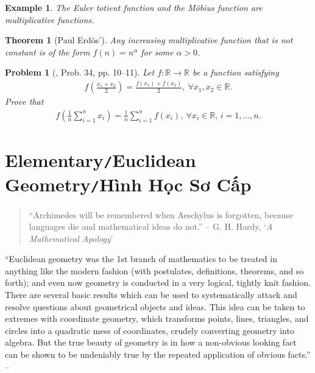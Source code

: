 \documentclass[oneside]{book}
\numberwithin{equation}{section}
\newtheorem{theorem}{Theorem}[section]
\newtheorem{example}{Example}[section]
\newtheorem{problem}{Problem}[section]
\begin{document}
\begin{example}
	The \emph{Euler totient function} and the \emph{M\"obius function} are multiplicative functions.
\end{example}

\begin{theorem}[Paul Erd\"os']
	Any increasing multiplicative function that is not constant is of the form $f(n) = n^\alpha$ for some $\alpha > 0$.
\end{theorem}

\begin{problem}[\cite{Gelca_Andreescu2017}, Prob. 34, pp. 10--11]
	Let $f:\mathbb{R}\to\mathbb{R}$ be a function satisfying
	\begin{align*}
		f\left(\frac{x_1 + x_2}{2}\right) = \frac{f(x_1) + f(x_2)}{2},\ \forall x_1,x_2\in\mathbb{R}.
	\end{align*}
	Prove that
	\begin{align*}
		f\left(\frac{1}{n}\sum_{i=1}^n x_i\right) = \frac{1}{n}\sum_{i=1}^n f(x_i),\ \forall x_i\in\mathbb{R},\,i = 1,\ldots,n.
	\end{align*}
\end{problem}


\chapter{Elementary\texttt{/}Euclidean Geometry\texttt{/}Hình Học Sơ Cấp}
\begin{quotation}
	``Archimedes will be remembered when Aeschylus is forgotten, because languages die and mathematical ideas do not.'' -- G. H. Hardy, `\textit{A Mathematical Apology}'
\end{quotation}
``Euclidean geometry was the 1st branch of mathematics to be treated in anything like the modern fashion (with postulates, definitions, theorems, and so forth); and even now geometry is conducted in a very logical, tightly knit fashion. There are several basic results which can be used to systematically attack and resolve questions about geometrical objects and ideas. This idea can be taken to extremes with coordinate geometry, which transforms points, lines, triangles, and circles into a quadratic mess of coordinates, crudely converting geometry into algebra. But the true beauty of geometry is in how a non-obvious looking fact can be shown to be undeniably true by the repeated application of obvious facts.'' -- \cite[Chap. 4, p. 49]{Tao2006}
\end{document}

